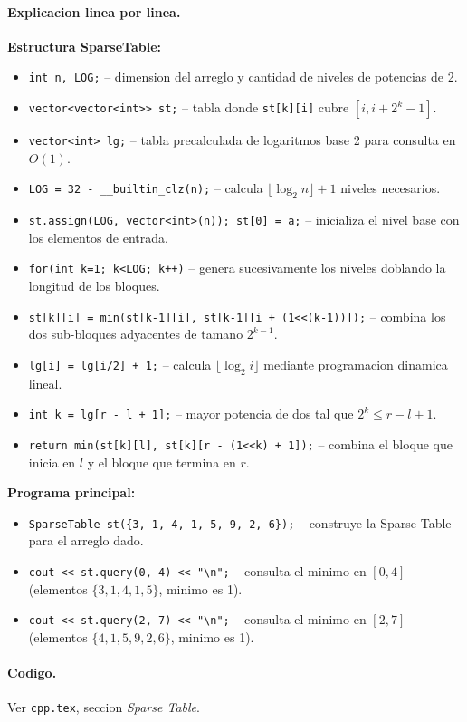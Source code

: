\paragraph{Explicacion linea por linea.}
\textbf{Estructura SparseTable:}
\begin{itemize}\setlength\itemsep{0pt}
	\item \verb|int n, LOG;| -- dimension del arreglo y cantidad de niveles de potencias de 2.
	\item \verb|vector<vector<int>> st;| -- tabla donde \texttt{st[k][i]} cubre $[i, i + 2^k - 1]$.
	\item \verb|vector<int> lg;| -- tabla precalculada de logaritmos base 2 para consulta en $O(1)$.
	\item \verb|LOG = 32 - __builtin_clz(n);| -- calcula $\lfloor \log_2 n \rfloor + 1$ niveles necesarios.
	\item \verb|st.assign(LOG, vector<int>(n)); st[0] = a;| -- inicializa el nivel base con los elementos de entrada.
	\item \verb|for(int k=1; k<LOG; k++)| -- genera sucesivamente los niveles doblando la longitud de los bloques.
	\item \verb|st[k][i] = min(st[k-1][i], st[k-1][i + (1<<(k-1))]);| -- combina los dos sub-bloques adyacentes de tamano $2^{k-1}$.
	\item \verb|lg[i] = lg[i/2] + 1;| -- calcula $\lfloor \log_2 i \rfloor$ mediante programacion dinamica lineal.
	\item \verb|int k = lg[r - l + 1];| -- mayor potencia de dos tal que $2^k \le r - l + 1$.
	\item \verb|return min(st[k][l], st[k][r - (1<<k) + 1]);| -- combina el bloque que inicia en $l$ y el bloque que termina en $r$.
\end{itemize}
\textbf{Programa principal:}
\begin{itemize}\setlength\itemsep{0pt}
	\item \verb|SparseTable st({3, 1, 4, 1, 5, 9, 2, 6});| -- construye la Sparse Table para el arreglo dado.
	\item \verb|cout << st.query(0, 4) << "\n";| -- consulta el minimo en $[0, 4]$ (elementos $\{3, 1, 4, 1, 5\}$, minimo es 1).
	\item \verb|cout << st.query(2, 7) << "\n";| -- consulta el minimo en $[2, 7]$ (elementos $\{4, 1, 5, 9, 2, 6\}$, minimo es 1).
\end{itemize}

\paragraph{Codigo.}
Ver \texttt{cpp.tex}, seccion \textit{Sparse Table}.

\vspace{0.5em}


